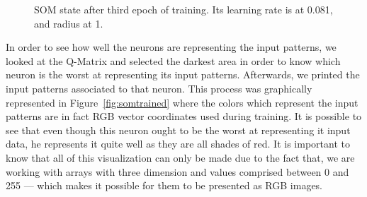 \begin{figure}[h!]
  \centering
  \hspace*{0.5cm}
  \hspace*{0.5cm}
  \hspace*{0.5cm}
  \caption{ SOM state after third epoch of training. Its learning rate is at 0.081, and radius at 1.  }
  \label{fig:}
\end{figure}

In order to see how well the neurons are representing the input patterns, we looked at the \ac{Q-Matrix} and selected the darkest area in order to know which neuron is the worst at representing its input patterns. Afterwards, we printed the input patterns associated to that neuron. This process was graphically represented in Figure~\ref{fig:somtrained} where the colors which represent the input patterns are in fact RGB vector coordinates used during training. It is possible to see that even though this neuron ought to be the worst at representing it input data, he represents it quite well as they are all shades of red. 
It is important to know that all of this visualization can only be made due to the fact that, we are working with arrays with three dimension and values comprised between 0 and 255 --- which makes it possible for them to be presented as RGB images. 

